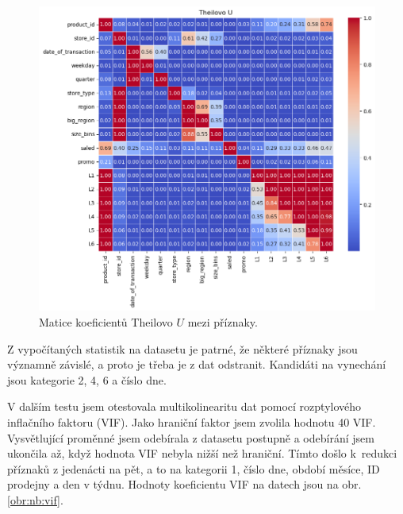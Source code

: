 \begin{figure}[h!]
    \centering
    \includegraphics[width=\textwidth]{obrazky/pripravadat/theils_u-002.png}
    \caption{Matice koeficientů Theilovo $U$ mezi příznaky.}
    \label{obr:nb:thiels}
\end{figure}

Z vypočítaných statistik na datasetu je patrné, že některé příznaky jsou významně závislé, a proto je třeba je z dat odstranit. Kandidáti na vynechání jsou kategorie 2, 4, 6 a číslo dne. 

V dalším testu jsem otestovala multikolinearitu dat pomocí rozptylového inflačního faktoru (VIF). Jako hraniční faktor jsem zvolila hodnotu 40 VIF. 
Vysvětlující proměnné jsem odebírala z datasetu postupně a odebírání jsem ukončila až, když hodnota VIF nebyla nižší než hraniční.
Tímto došlo k~redukci příznaků z jedenácti na pět, a to na kategorii 1, číslo dne, období měsíce, ID prodejny a den v týdnu. Hodnoty koeficientu VIF na datech jsou na obr. \ref*{obr:nb:vif}. 

